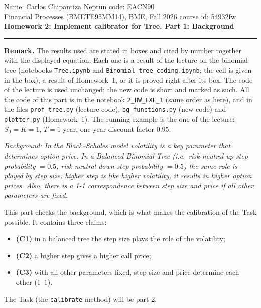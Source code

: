 \documentclass[11pt,a4paper]{article}
\newcommand{\subhead}[1]{\par\medskip\noindent{\large\bfseries #1}\par\smallskip\noindent\ignorespaces}
\begin{document}
\noindent Name: Carlos Chipantiza \hfill Neptun code: EACN90\\
\noindent Financial Processes (BMETE95MM14), BME, Fall 2026 \hfill course id: 54932fw\\[2pt]
{\large\textbf{Homework 2: Implement calibrator for Tree. Part 1: Background}}\\[2pt]
\noindent\rule{\textwidth}{0.4pt}

\noindent\textbf{Remark.} The results used are stated in boxes and cited by number together with the displayed equation. Each one is a result of the lecture on the binomial tree (notebooks \texttt{Tree.ipynb} and \texttt{Binomial\_tree\_coding.ipynb}; the cell is given in the box), a result of Homework~1, or it is proved right after its box. The code of the lecture is used unchanged; the new code is short and marked as such. All the code of this part is in the notebook \texttt{2\_HW\_EXE\_1} (same order as here), and in the files \texttt{prof\_tree.py} (lecture code), \texttt{bg\_functions.py} (new code) and \texttt{plotter.py} (Homework~1). The running example is the one of the lecture: $S_0=K=1$, $T=1$ year, one-year discount factor $0.95$.

\vspace{0.5 cm}
\subhead{The assignment.}
\emph{Background: In the Black--Scholes model volatility is a key parameter that determines option price. In a Balanced Binomial Tree (i.e.\ risk-neutral up step probability $=0.5$, risk-neutral down step probability $=0.5$) the same role is played by step size: higher step is like higher volatility, it results in higher option prices. Also, there is a 1-1 correspondence between step size and price if all other parameters are fixed.}

\noindent This part checks the background, which is what makes the calibration of the Task possible. It contains three claims:
\begin{itemize}
\item \textbf{(C1)} in a balanced tree the step size plays the role of the volatility;
\item \textbf{(C2)} a higher step gives a higher call price;
\item \textbf{(C3)} with all other parameters fixed, step size and price determine each other (1--1).
\end{itemize}
The Task (the \texttt{calibrate} method) will be part 2.

\subhead{Results used.}
\end{document}
